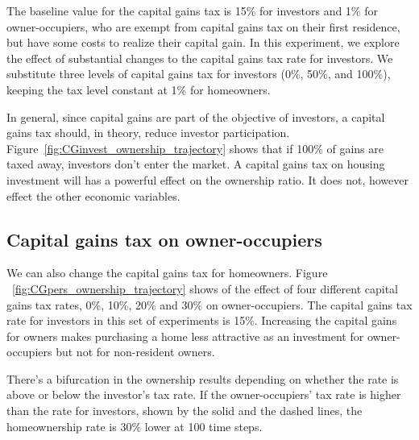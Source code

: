 The baseline value for the capital gains tax is 15\% for investors and 1\% for owner-occupiers, who are  exempt from capital gains tax on their first residence, but have some costs to realize their capital gain. In this experiment, we explore the effect of substantial changes to the capital gains tax rate for investors. 
We substitute three  levels  of capital gains tax for investors (0\%, 50\%, and 100\%), keeping the tax level constant at 1\% for homeowners.

In general, since capital gains are part of the objective of investors, a capital gains tax should, in theory, reduce investor participation. Figure~\ref{fig:CGinvest_ownership_trajectory} shows that if 100\% of gains are taxed away, investors don't enter the market. A capital gains tax on housing investment will has a powerful effect on the ownership ratio. It does not, however effect the other economic variables. %

\newpage
\subsection{Capital gains tax on owner-occupiers}
We can also change the capital gains tax for homeowners. 
Figure ~\ref{fig:CGpers_ownership_trajectory} shows of the effect of four different capital gains tax rates, 0\%, 10\%, 20\% and 30\% on owner-occupiers. The capital gains tax rate for investors in this set of experiments is 15\%. Increasing the capital gains for owners makes purchasing a home less attractive as an investment for owner-occupiers but not for non-resident owners. %


There's a bifurcation in the ownership results depending on whether the rate is above or below the investor's tax rate.  If the owner-occupiers' tax rate is higher than the rate for investors,  shown by the solid and the dashed lines,  the homeownership rate is  30\% lower at 100 time steps. 


